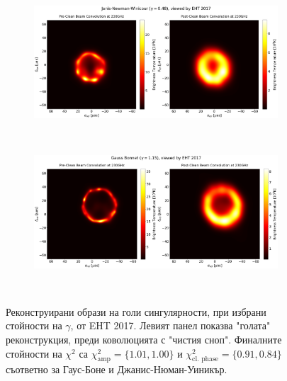 \begin{figure}[h!]
	\centering
	\begin{subfigure}{12cm}
		\hspace{-1.5cm}
		\includegraphics[scale = 0.23]{Ehtim_plot_2017_no_blur_JNW.png}
	\end{subfigure}\\
	\begin{subfigure}{12cm}
		\hspace{-1.5cm}
		\includegraphics[scale = 0.23]{Ehtim_plot_2017_no_blur_GB.png}
	\end{subfigure}\\
	\label{Naked_Singularity_EHT_2017}
	\caption[Реконструирани образи на голи сингулярности, при избрани стойности на $\gamma$, от EHT 2017]{Реконструирани образи на голи сингулярности, при избрани стойности на $\gamma$, от EHT 2017. Левият панел показва "голата"$\,$ реконструкция, преди коволюцията с "чистия сноп". Финалните стойности на $\chi^2$ са $\chi^2_\text{amp} = \{1.01, 1.00\}$ и $\chi^2_\text{cl. phase} = \{0.91, 0.84\}$ съответно за Гаус-Боне и Джанис-Нюман-Уиникър.} 
\end{figure}

